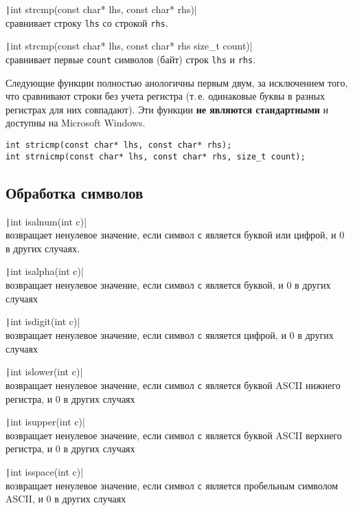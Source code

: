 \texttt|int strcmp(const char* lhs, const char* rhs)|\\
сравнивает строку \verb|lhs| со строкой \verb|rhs|.

\texttt|int strcmp(const char* lhs, const char* rhs size_t count)|\\
сравнивает первые \verb|count| символов (байт) строк \verb|lhs| и \verb|rhs|.

\hspace{1cm}

Следующие функции полностью анологичны первым двум, за исключением того,
что сравнивают строки без учета регистра (т.\,е. одинаковые буквы в разных
регистрах для них совпадают). Эти функции \textbf{не являются стандартными}
и доступны на Microsoft Windows.
\begin{verbatim}
int stricmp(const char* lhs, const char* rhs);  
int strnicmp(const char* lhs, const char* rhs, size_t count);
\end{verbatim}

\subsection{Обработка символов}

\texttt|int isalnum(int c)| \\
возвращает ненулевое значение, если символ \verb|с| является буквой или цифрой, и 0 в других случаях.

\texttt|int isalpha(int c)| \\
возвращает ненулевое значение, если символ \verb|с| является буквой, и 0 в других случаях

\texttt|int isdigit(int c)| \\
возвращает ненулевое значение, если символ \verb|с| является цифрой, и 0 в других случаях

\texttt|int islower(int c)| \\
возвращает ненулевое значение, если символ \verb|с| является буквой ASCII нижнего регистра, и 0 в других случаях

\texttt|int isupper(int c)| \\
возвращает ненулевое значение, если символ \verb|с| является буквой ASCII верхнего регистра, и 0 в других случаях

\texttt|int isspace(int c)| \\
возвращает ненулевое значение, если символ \verb|с| является пробельным символом ASCII, и 0 в других случаях

